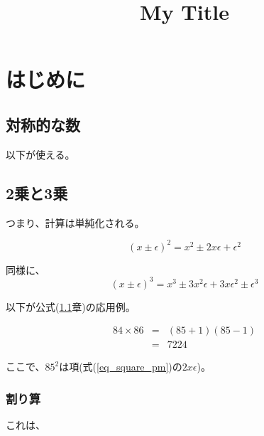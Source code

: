 \documentclass[a4paper, 12pt]{article}
\begin{document}
\tableofcontents  %

\title{My Title}
\maketitle

\section{はじめに}

\setcounter{section}{4}
\setcounter{subsection}{5}
\subsection{対称的な数}
\label{sec_symmetry_mul}

以下が使える。

\addtocounter{subsection}{1}
\subsection{2乗と3乗}

つまり、計算は単純化される。

\begin{equation}
  (x \pm \epsilon)^2 = x^2 \pm 2x\epsilon + \epsilon^2 \label{eq_square_pm}
\end{equation}

同様に、
\begin{equation}
  (x \pm \epsilon)^3 = x^3 \pm 3x^2\epsilon + 3x\epsilon^2 \pm \epsilon^3 \label{eq_cubic_pm}
\end{equation}

以下が公式(\ref{sec_symmetry_mul}章)の応用例。

\begin{eqnarray}
  84\times 86 & = & (85+1)(85-1) \nonumber\\
              & = & 7224
\end{eqnarray}

ここで、$85^2$は項(式(\ref{eq_square_pm})の$2x\epsilon$)。 

\addtocounter{subsection}{1}
\subsubsection{割り算}

これは、
\end{document}
